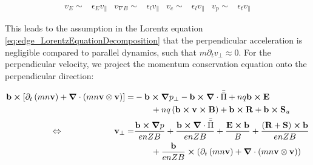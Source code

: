 \begin{align}
	v_E \sim& \epsilon_E v_\parallel & v_{\nabla B} \sim& \epsilon_l v_\parallel & v_c \sim& \epsilon_l v_\parallel  & v_p \sim& \epsilon_t v_\parallel
\end{align}

This leads to the assumption in the Lorentz equation \ref{eq:edge_LorentzEquationDecomposition} that the perpendicular acceleration is negligible compared to parallel dynamics, such that $m\partial_t v_\perp \approx 0$. For the perpendicular velocity, we project the momentum conservation equation onto the perpendicular direction:

\begin{align}
	\mathbf{b}\cross\left[\partial_t \left(mn\mathbf{v}\right) + \grad\cdot\left(mn\mathbf{v}\otimes\mathbf{v}\right)\right] =& -\mathbf{b}\cross\grad p_\perp - \mathbf{b}\cross\grad\cdot\bar{\bar{\Pi}} + nq\mathbf{b}\cross\mathbf{E} \nonumber\\ & \qquad + nq\left(\mathbf{b}\cross\mathbf{v}\cross\mathbf{B}\right) + \mathbf{b}\cross\mathbf{R} + \mathbf{b}\cross\mathbf{S}_u \nonumber \\
	\Leftrightarrow\qquad \qquad \qquad
	\mathbf{v}_\perp =& \frac{\mathbf{b}\cross\grad p}{enZB} + \frac{\mathbf{b}\cross\grad\cdot\bar{\bar{\Pi}}}{enZB} +  \frac{\mathbf{E}\cross\mathbf{b}}{B} + \frac{\left(\textbf{R}+\textbf{S}\right)\cross\mathbf{b}}{enZB} \nonumber\\ & \qquad + \frac{\mathbf{b}}{enZB} \cross \left(\partial_t \left(mn\mathbf{v}\right) + \grad\cdot\left(mn\mathbf{v}\otimes\mathbf{v}\right)\right)
\end{align}

